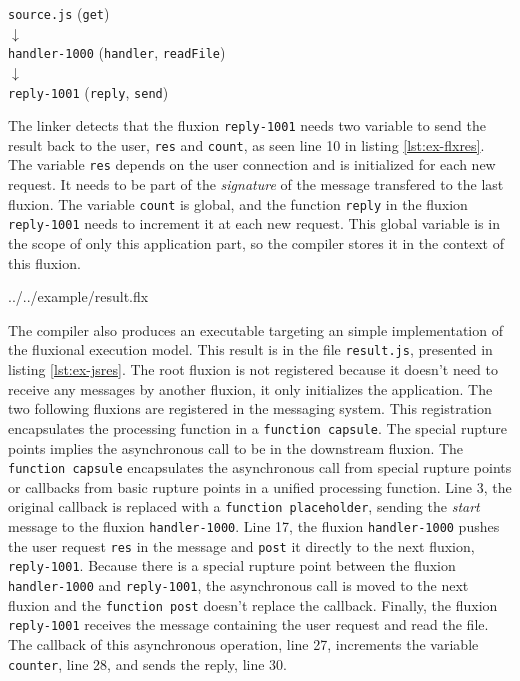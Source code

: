 \begin{center}
\texttt{source.js} (\texttt{get})\\
$\downarrow$\\
\texttt{handler-1000} (\texttt{handler}, \texttt{readFile})\\
$\downarrow$\\
\texttt{reply-1001} (\texttt{reply}, \texttt{send})
\end{center}

The linker detects that the fluxion \texttt{reply-1001} needs two variable to send the result back to the user, \texttt{res} and \texttt{count}, as seen line 10 in listing \ref{lst:ex-flxres}.
The variable \texttt{res} depends on the user connection and is initialized for each new request.
It needs to be part of the \textit{signature} of the message transfered to the last fluxion.
The variable \texttt{count} is global, and the function \texttt{reply} in the fluxion \texttt{reply-1001} needs to increment it at each new request.
This global variable is in the scope of only this application part, so the compiler stores it in the context of this fluxion.

{../../example/result.flx}

The compiler also produces an executable targeting an simple implementation of the fluxional execution model.
This result is in the file \texttt{result.js}, presented in listing \ref{lst:ex-jsres}.
The root fluxion is not registered because it doesn't need to receive any messages by another fluxion, it only initializes the application.
The two following fluxions are registered in the messaging system.
This registration encapsulates the processing function in a \texttt{function capsule}.
The special rupture points implies the asynchronous call to be in the downstream fluxion.
The \texttt{function capsule} encapsulates the asynchronous call from special rupture points or callbacks from basic rupture points in a unified processing function.
Line 3, the original callback is replaced with a \texttt{function placeholder}, sending the \textit{start} message to the fluxion \texttt{handler-1000}.
Line 17, the fluxion \texttt{handler-1000} pushes the user request \texttt{res} in the message and \texttt{post} it directly to the next fluxion, \texttt{reply-1001}.
Because there is a special rupture point between the fluxion \texttt{handler-1000} and \texttt{reply-1001}, the asynchronous call is moved to the next fluxion and the \texttt{function post} doesn't replace the callback.
Finally, the fluxion \texttt{reply-1001} receives the message containing the user request and read the file.
The callback of this asynchronous operation, line 27, increments the variable \texttt{counter}, line 28, and sends the reply, line 30.

